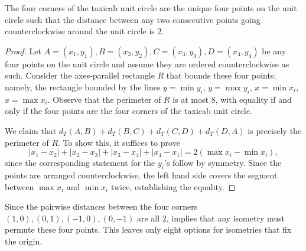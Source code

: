 \documentclass{mystyle}
\begin{document}
\begin{proposition}\label{prop_four_corners}
The four corners of the taxicab unit circle are the unique four points on the unit circle such that the distance between any two consecutive points going counterclockwise around the unit circle is $2$. 
\end{proposition}
\begin{proof}
Let $A = (x_1, y_1), B = (x_2, y_2), C = (x_3, y_3), D = (x_4, y_4)$ be any four points on the unit circle and assume they are ordered counterclockwise as such. Consider the axes-parallel rectangle $R$ that bounds these four points; namely, the rectangle bounded by the lines $y = \min y_i$, $y = \max y_i$, $x = \min x_i$, $x = \max x_i$. Observe that the perimeter of $R$ is at most $8$, with equality if and only if the four points are the four corners of the taxicab unit circle. 

We claim that $d_T(A, B) + d_T(B, C) + d_T(C, D) + d_T(D, A)$ is precisely the perimeter of $R$. To show this, it suffices to prove
\[ 
    |x_1 - x_2| + |x_2 - x_3| + |x_3 - x_4| + |x_4 - x_1| = 2 (\max x_i - \min x_i),
\]
since the corresponding statement for the $y_i$'s follow by symmetry. Since the points are arranged counterclockwise, the left hand side covers the segment between $\max x_i$ and $\min x_i$ twice, establishing the equality. 
\end{proof}

Since the pairwise distances between the four corners $(1,0), (0,1), (-1, 0), (0, -1)$ are all $2$,  implies that any isometry must permute these four points. This leaves only eight options for isometries that fix the origin.
\end{document}
